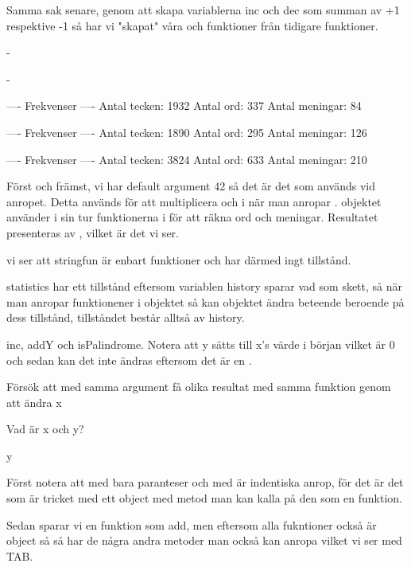 Samma sak senare, genom att skapa variablerna inc och dec som summan av +1 respektive -1 så har vi "skapat" våra  och  funktioner från tidigare funktioner.

\Task

\Subtask -

\Subtask -

\Subtask 
\begin{REPLnonum}

---- Frekvenser ----
Antal tecken: 1932
Antal ord: 337
Antal meningar: 84

---- Frekvenser ----
Antal tecken: 1890
Antal ord: 295
Antal meningar: 126

---- Frekvenser ----
Antal tecken: 3824
Antal ord: 633
Antal meningar: 210

\end{REPLnonum}

Först och främst, vi har default argument 42 så det är det som används vid anropet. Detta används för att multiplicera  och  i  när man anropar .  objektet använder i sin tur funktionerna i  för att räkna ord och meningar. Resultatet presenteras av , vilket är det vi ser.

\Subtask vi ser att stringfun är enbart funktioner och har därmed ingt tillstånd.

statistics har ett tillstånd eftersom variablen history sparar vad som skett, så när man anropar funktionener i objektet så kan objektet ändra beteende beroende på dess tillstånd, tillståndet består alltså av history.

\Task

\Subtask inc, addY och isPalindrome. Notera att y sätts till x's värde i början vilket är 0 och sedan kan det inte ändras eftersom det är en .

\Subtask Försök att med samma argument få olika resultat med samma funktion genom att ändra x

\Subtask Vad är x och y?

\Subtask y

\Task

\Subtask
Först notera att  med bara paranteser och med  är indentiska anrop, för det är det som är tricket med ett object med  metod man kan kalla på den som en funktion.

Sedan sparar vi en funktion som add, men eftersom alla fukntioner också är object så så har de några andra metoder man också kan anropa vilket vi ser med TAB. 

